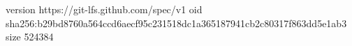 version https://git-lfs.github.com/spec/v1
oid sha256:b29bd8760a564ccd6aecf95c231518dc1a365187941cb2c80317f863dd5e1ab3
size 524384
